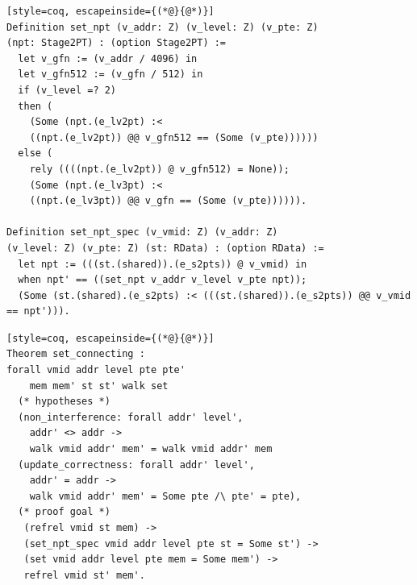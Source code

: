 \begin{listing}
\caption{The high-level specification of }
\label{code:spoq_set}
\begin{lstlisting}[style=coq, escapeinside={(*@}{@*)}]
Definition set_npt (v_addr: Z) (v_level: Z) (v_pte: Z)
(npt: Stage2PT) : (option Stage2PT) :=
  let v_gfn := (v_addr / 4096) in
  let v_gfn512 := (v_gfn / 512) in
  if (v_level =? 2)
  then (
    (Some (npt.(e_lv2pt) :< 
    ((npt.(e_lv2pt)) @@ v_gfn512 == (Some (v_pte))))))
  else (
    rely ((((npt.(e_lv2pt)) @ v_gfn512) = None));
    (Some (npt.(e_lv3pt) :< 
    ((npt.(e_lv3pt)) @@ v_gfn == (Some (v_pte)))))).

Definition set_npt_spec (v_vmid: Z) (v_addr: Z)
(v_level: Z) (v_pte: Z) (st: RData) : (option RData) :=
  let npt := (((st.(shared)).(e_s2pts)) @ v_vmid) in
  when npt' == ((set_npt v_addr v_level v_pte npt));
  (Some (st.(shared).(e_s2pts) :< (((st.(shared)).(e_s2pts)) @@ v_vmid == npt'))).
\end{lstlisting}
\end{listing}
\begin{listing}
\caption{The connecting theorem of }
\label{code:spoq_set_conn}
\begin{lstlisting}[style=coq, escapeinside={(*@}{@*)}]
Theorem set_connecting :
forall vmid addr level pte pte' 
    mem mem' st st' walk set
  (* hypotheses *)
  (non_interference: forall addr' level',
    addr' <> addr ->
    walk vmid addr' mem' = walk vmid addr' mem
  (update_correctness: forall addr' level',
    addr' = addr ->
    walk vmid addr' mem' = Some pte /\ pte' = pte),
  (* proof goal *)
   (refrel vmid st mem) ->
   (set_npt_spec vmid addr level pte st = Some st') ->
   (set vmid addr level pte mem = Some mem') ->
   refrel vmid st' mem'.
\end{lstlisting}
\end{listing}
